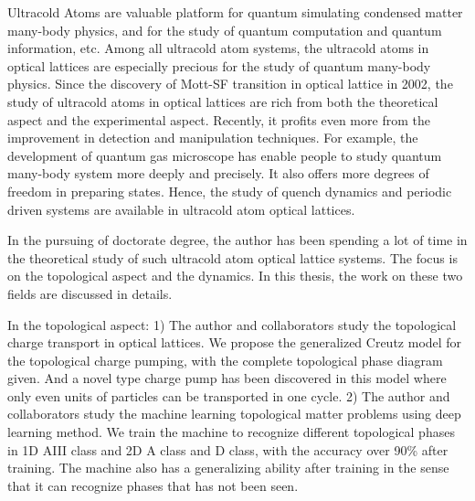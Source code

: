 
\begin{eabstract}
Ultracold Atoms are valuable platform for quantum simulating condensed matter many-body physics, and for the study of quantum computation and quantum information, etc. Among all ultracold atom systems, the ultracold atoms in optical lattices are especially precious for the study of quantum many-body physics. Since the discovery of Mott-SF transition in optical lattice in 2002, the study of ultracold atoms in optical lattices are rich from both the theoretical aspect and the experimental aspect. Recently, it profits even more from the improvement in detection and manipulation techniques. For example, the development of quantum gas microscope has enable people to study quantum many-body system more deeply and precisely. It also offers more degrees of freedom in preparing states. Hence, the study of quench dynamics and periodic driven systems are available in ultracold atom optical lattices.

In the pursuing of doctorate degree, the author has been spending a lot of time in the theoretical study of such ultracold atom optical lattice systems. The focus is on the topological aspect and the dynamics. In this thesis, the work on these two fields are discussed in details. 

In the topological aspect:
1) The author and collaborators study the topological charge transport in optical lattices. We propose the generalized Creutz model for the topological charge pumping, with the complete topological phase diagram given. And a novel type charge pump has been discovered in this model where only even units of particles can be transported in one cycle.
2) The author and collaborators study the machine learning topological matter problems using deep learning method. We train the machine to recognize different topological phases in 1D AIII class and 2D A class and D class, with the accuracy over 90\% after training. The machine also has a generalizing ability after training in the sense that it can recognize phases that has not been seen.


\end{eabstract}
